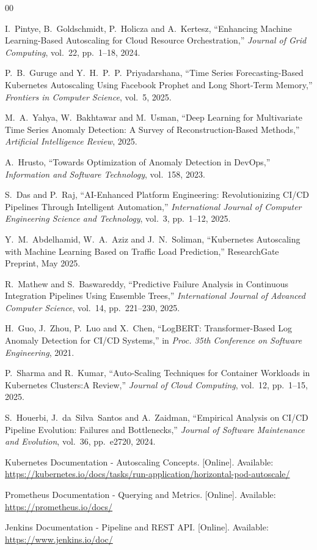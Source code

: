 \documentclass[12pt]{report}
\begin{document}
\begin{thebibliography}{00}

I.~Pintye, B.~Goldschmidt, P.~Holicza and A.~Kertesz, 
“Enhancing Machine Learning-Based Autoscaling for Cloud Resource Orchestration,” 
\textit{Journal of Grid Computing}, vol.~22, pp.~1--18, 2024.

P.~B.~Guruge and Y.~H.~P.~P.~Priyadarshana, 
“Time Series Forecasting-Based Kubernetes Autoscaling Using Facebook Prophet and Long Short-Term Memory,” 
\textit{Frontiers in Computer Science}, vol.~5, 2025.

M.~A.~Yahya, W.~Bakhtawar and M.~Usman, 
“Deep Learning for Multivariate Time Series Anomaly Detection: A Survey of Reconstruction-Based Methods,” 
\textit{Artificial Intelligence Review}, 2025.

A.~Hrusto, 
“Towards Optimization of Anomaly Detection in DevOps,” 
\textit{Information and Software Technology}, vol.~158, 2023.

S.~Das and P.~Raj, 
“AI-Enhanced Platform Engineering: Revolutionizing CI/CD Pipelines Through Intelligent Automation,” 
\textit{International Journal of Computer Engineering Science and Technology}, vol.~3, pp.~1--12, 2025.

Y.~M.~Abdelhamid, W.~A.~Aziz and J.~N.~Soliman, 
“Kubernetes Autoscaling with Machine Learning Based on Traffic Load Prediction,” 
ResearchGate Preprint, May 2025.

R.~Mathew and S.~Baswareddy, 
“Predictive Failure Analysis in Continuous Integration Pipelines Using Ensemble Trees,” 
\textit{International Journal of Advanced Computer Science}, vol.~14, pp.~221--230, 2025.

H.~Guo, J.~Zhou, P.~Luo and X.~Chen, 
“LogBERT: Transformer-Based Log Anomaly Detection for CI/CD Systems,” 
in \textit{Proc. 35th Conference on Software Engineering}, 2021.

P.~Sharma and R.~Kumar, 
“Auto-Scaling Techniques for Container Workloads in Kubernetes Clusters:A Review,” 
\textit{Journal of Cloud Computing}, vol.~12, pp.~1--15, 2025.

S.~Houerbi, J.~da~Silva~Santos and A.~Zaidman, 
“Empirical Analysis on CI/CD Pipeline Evolution: Failures and Bottlenecks,” 
\textit{Journal of Software Maintenance and Evolution}, vol.~36, pp.~e2720, 2024.

Kubernetes Documentation -  Autoscaling Concepts. 
[Online]. Available: \url{https://kubernetes.io/docs/tasks/run-application/horizontal-pod-autoscale/}

Prometheus Documentation - Querying and Metrics. 
[Online]. Available: \url{https://prometheus.io/docs/}

Jenkins Documentation - Pipeline and REST API. 
[Online]. Available: \url{https://www.jenkins.io/doc/}

\end{thebibliography}
\end{document}
